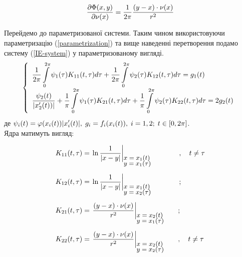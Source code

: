 \documentclass[14pt,a4paper]{extarticle}
\newcounter{e}
\numberwithin{equation}{section}
\numberwithin{figure}{section}
\newcommand{\intl}{\int\limits}
\newcommand{\inttwopi}{\intl_{0}^{2\pi}}
\begin{document}
\begin{equation}
	\pdv{\Phi(x, y)}{\nu(x)} = \frac{1}{2\pi} \frac{(y - x) \cdot \nu(x)}{r^2} 
\end{equation}


Перейдемо до параметризованої системи. Таким чином використовуючи параметризацію (\ref{parametrization}) та вище наведенні перетворення подамо систему (\ref{IE-system}) у параметризованому вигляді.
\begin{equation}
\label{IE-parametrized-with-specia}
	\left\{
	\begin{array}{l}
		\displaystyle
		\frac{1}{2\pi} \inttwopi \psi_1(\tau) K_{11}(t, \tau) d \tau
		+ \frac{1}{2\pi} \inttwopi  \psi_2(\tau) K_{12}(t, \tau) d \tau
		= g_{1}(t)
		\\ [0.3cm]
		\displaystyle
		\frac{\psi_2(t)}{\abs{x'_{2}(t)) }}
		+ \frac{1}{\pi} \inttwopi \psi_1(\tau) K_{21}(t, \tau) d \tau
		+ \frac{1}{\pi} \inttwopi  \psi_2(\tau) K_{22}(t, \tau) d \tau
		= 2g_{2}(t)
	\end{array}\right.
\end{equation}
де $\displaystyle \psi_{i}(t) = \varphi(x_{i}(t)) \abs{x'_{i}(t)}, \; g_{i} = f_{i}(x_{i}(t)), \;  i  = 1, 2; \; t \in [0, 2\pi]$. \\[0.3cm]
Ядра матимуть вигляд:

$$
	\begin{array}{l}
		\displaystyle
		K_{11}(t, \tau) = \left.
			 \ln{\frac{1}{\abs{x - y}}}
		\right|_{
			{\small \parbox{20mm}{$ x = x_1(t)$ \\[-3pt] $y = x_1 ({\tau})$}}
		} \quad \quad, \quad t \neq \tau
		\\ [0.8cm]
		
		\displaystyle
		K_{12}(t, \tau) = \left.
			\ln{\frac{1}{\abs{x - y}}}
		\right|_{
			{\small \parbox{20mm}{$ x = x_1(t)$ \\[-3pt] $y = x_2 ({\tau})$}}
		} \quad \quad;
		\\ [0.8cm]
		
		\displaystyle
		K_{21}(t, \tau) = \left.
			\frac{(y - x) \cdot \nu(x)}{r^2}
		\right|_{
			{\small \parbox{20mm}{$ x = x_2(t)$ \\[-3pt] $y = x_1 ({\tau})$}}
		};
		\\ [0.8cm]
		
		\displaystyle
		K_{22}(t, \tau) = \left.
			\frac{(y - x) \cdot \nu(x)}{r^2}
		\right|_{
			{\small \parbox{20mm}{$ x = x_2(t)$ \\[-3pt] $y = x_2 ({\tau})$}}
		} 
		, \quad t \neq \tau
	\end{array}
$$
\end{document}
